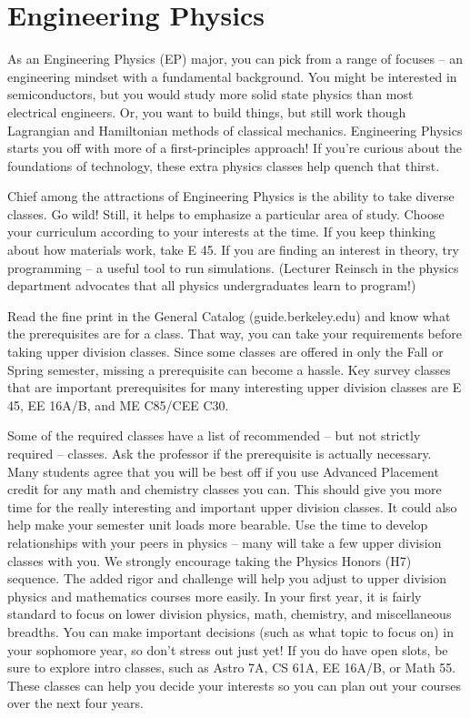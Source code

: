 \chapter*{Engineering Physics}

As an Engineering Physics (EP) major, you can pick from a range of focuses – an engineering mindset with a fundamental background. You might be interested in semiconductors, but you would study more solid state physics than most electrical engineers. Or, you want to build things, but still work though Lagrangian and Hamiltonian methods of classical mechanics. Engineering Physics starts you off with more of a first-principles approach! If you’re curious about the foundations of technology, these extra physics classes help quench that thirst.

Chief among the attractions of Engineering Physics is the ability to take diverse classes. Go wild! Still, it helps to emphasize a particular area of study. Choose your curriculum according to your interests at the time. If you keep thinking about how materials work, take E 45. If you are finding an interest in theory, try programming – a useful tool to run simulations. (Lecturer Reinsch in the physics department advocates that all physics undergraduates learn to program!)

Read the fine print in the General Catalog ({\selectfont guide.berkeley.edu}) and know what the prerequisites are for a class. That way, you can take your requirements before taking upper division classes. Since some classes are offered in only the Fall or Spring semester, missing a prerequisite can become a hassle. Key survey classes that are important prerequisites for many interesting upper division classes are E 45, EE 16A/B, and ME C85/CEE C30.

Some of the required classes have a list of recommended – but not strictly required – classes. Ask the professor if the prerequisite is actually necessary. Many students agree that you will be best off if you use Advanced Placement credit for any math and chemistry classes you can. This should give you more time for the really interesting and important upper division classes. It could also help make your semester unit loads more bearable. Use the time to develop relationships with your peers in physics – many will take a few upper division classes with you. We strongly encourage taking the Physics Honors (H7) sequence. The added rigor and challenge will help you adjust to upper division physics and mathematics courses more easily.
In your first year, it is fairly standard to focus on lower division physics, math, chemistry, and miscellaneous breadths. You can make important decisions (such as what topic to focus on) in your sophomore year, so don't stress out just yet! If you do have open slots, be sure to explore intro classes, such as Astro 7A, CS 61A, EE 16A/B, or Math 55. These classes can help you decide your interests so you can plan out your courses over the next four years.

